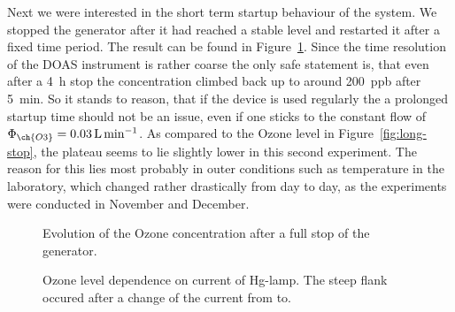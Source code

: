 Next we were interested in the short term startup behaviour of the
system. We stopped the generator after it had reached a stable level
and restarted it after a fixed time period. The result can be found in
Figure~\ref{fig:multiple-stop}. Since the time resolution of the DOAS
instrument is rather coarse the only safe statement is, that even
after a \SI{4}{\hour} stop the concentration climbed back up to around
\SI{200}{ppb} after \SI{5}{\minute}. So it stands to reason, that if
the device is used regularly the a prolonged startup time should not
be an issue, even if one sticks to the constant flow of
$\Phi_{\ch{O3}} = \SI{0.03}{\liter\per\minute}$. As compared to the
Ozone level in Figure~\ref{fig:long-stop}, the plateau seems to lie
slightly lower in this second experiment. The reason for this lies
most probably in outer conditions such as temperature in the
laboratory, which changed rather drastically from day to day, as the
experiments were conducted in November and December.

\begin{figure}[htbp]
  \centering
  \caption{Evolution of the Ozone concentration after a full stop of the
    generator.}
  \label{fig:multiple-stop}
\end{figure}

\begin{figure}[htbp]
  \centering
  \caption{Ozone level dependence on current of Hg-lamp. The steep
    flank occured after a change of the current from to.}
  \label{fig:lamp}
\end{figure}


